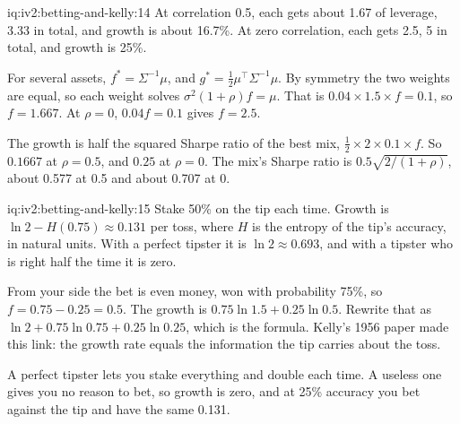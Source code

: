 \begin{solution}{iq:iv2:betting-and-kelly:14}
At correlation 0.5, each gets about 1.67 of leverage, 3.33 in total, and growth is about 16.7\%. At zero correlation, each gets 2.5, 5 in total, and growth is 25\%.

For several assets, $f^* = \Sigma^{-1}\mu$, and $g^* = \tfrac12\mu^\top\Sigma^{-1}\mu$. By symmetry the two weights are equal, so each weight solves $\sigma^2(1 + \rho)f = \mu$. That is $0.04 \times 1.5 \times f = 0.1$, so $f = 1.667$. At $\rho = 0$, $0.04f = 0.1$ gives $f = 2.5$.

The growth is half the squared Sharpe ratio of the best mix, $\tfrac12 \times 2 \times 0.1 \times f$. So $0.1667$ at $\rho = 0.5$, and $0.25$ at $\rho = 0$. The mix's Sharpe ratio is $0.5\sqrt{2/(1 + \rho)}$, about 0.577 at 0.5 and about 0.707 at 0.

\end{solution}

\begin{solution}{iq:iv2:betting-and-kelly:15}
Stake 50\% on the tip each time. Growth is $\ln 2 - H(0.75) \approx 0.131$ per toss, where $H$ is the entropy of the tip's accuracy, in natural units. With a perfect tipster it is $\ln 2 \approx 0.693$, and with a tipster who is right half the time it is zero.

From your side the bet is even money, won with probability 75\%, so $f = 0.75 - 0.25 = 0.5$. The growth is $0.75\ln 1.5 + 0.25\ln 0.5$. Rewrite that as $\ln 2 + 0.75\ln 0.75 + 0.25\ln 0.25$, which is the formula. Kelly's 1956 paper made this link: the growth rate equals the information the tip carries about the toss.

A perfect tipster lets you stake everything and double each time. A useless one gives you no reason to bet, so growth is zero, and at 25\% accuracy you bet against the tip and have the same 0.131.

\end{solution}

